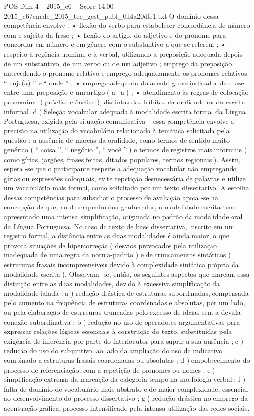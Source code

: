\begin{textsample}{POS Dim 4 – 2015\_c6 – Score 14.00 – 2015\_c6/enade\_2015\_tec\_gest\_publ\_0d4a20dfe1.txt}
O domínio dessa competência envolve : • flexão do verbo para estabelecer concordância de número com o sujeito da frase ; • flexão do artigo, do adjetivo e do pronome para concordar em número e em gênero com o substantivo a que se referem ; • respeito à regência nominal e à verbal, utilizando a preposição adequada depois de um substantivo, de um verbo ou de um adjetivo ; emprego da preposição antecedendo o pronome relativo e emprego adequadamente os pronomes relativos “ cujo(a) ” e “ onde ” ; • emprego adequado do acento grave indicador da crase entre uma preposição e um artigo ( a+a ) ; • atendimento às regras de colocação pronominal ( próclise e ênclise ), distintas dos hábitos da oralidade ou da escrita informal. d ) Seleção vocabular adequada à modalidade escrita formal da Língua Portuguesa, exigida pela situação comunicativa – essa competência envolve a precisão na utilização do vocabulário relacionado à temática solicitada pela questão ; a ausência de marcas da oralidade, como termos de sentido muito genérico ( “ coisa ”, “ negócio ”, “ você ” ) e termos de registros mais informais ( como gírias, jargões, frases feitas, ditados populares, termos regionais ).
Assim, espera -se que o participante respeite a adequação vocabular não empregando gírias ou expressões coloquiais, evite repetição desnecessária de palavras e utilize um vocabulário mais formal, como solicitado por um texto dissertativo.
A escolha dessas competências para subsidiar o processo de avaliação apoia -se na concepção de que, no desempenho dos graduandos, a modalidade escrita tem apresentado uma intensa simplificação, originada no padrão da modalidade oral da Língua Portuguesa.
No caso do texto de base dissertativa, inscrito em um registro formal, a distância entre as duas modalidades é ainda maior, o que provoca situações de hipercorreção ( desvios provocados pela utilização inadequada de uma regra da norma-padrão ) e de truncamentos sintáticos ( estruturas frasais incompreensíveis devido à complexidade sintática própria da modalidade escrita ).
Observam -se, então, os seguintes aspectos que marcam essa distinção entre as duas modalidades, devido à excessiva simplificação da modalidade falada : a ) redução drástica de estruturas subordinadas, compensada pelo aumento na frequência de estruturas coordenadas e absolutas, por um lado, ou pela elaboração de estruturas truncadas pelo excesso de ideias sem a devida conexão subordinativa ; b ) redução no uso de operadores argumentativas para expressar relações lógicas essenciais à construção do texto, substituídas pela exigência de inferência por parte do interlocutor para suprir a sua ausência ; c ) redução do uso do subjuntivo, ao lado da ampliação do uso do indicativo combinado a estruturas frasais coordenadas ou absolutas ; d ) empobrecimento do processo de referenciação, com a repetição de pronomes ou nomes ; e ) simplificação extrema da marcação da categoria tempo na morfologia verbal ; f ) falta de domínio de vocabulário mais abstrato e de maior complexidade, essencial ao desenvolvimento do processo dissertativo ; g ) redução drástica no emprego da acentuação gráfica, processo intensificado pela intensa utilização das redes sociais.

\end{textsample}
